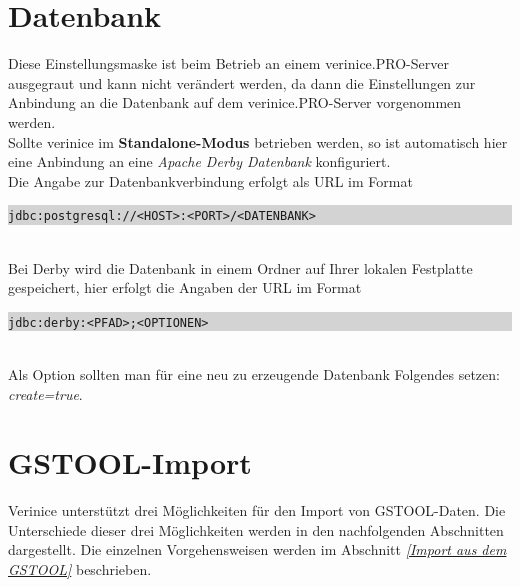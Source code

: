 \documentclass[a4paper,10pt]{book}
\begin{document}
\section{Datenbank} \label{sec:datenbank}
Diese Einstellungsmaske ist beim Betrieb an einem verinice.\textsc{PRO}-Server ausgegraut und kann nicht verändert werden, da dann die Einstellungen zur
Anbindung an die Datenbank auf dem verinice.\textsc{PRO}-Server vorgenommen werden.
\newline\\
Sollte verinice im \textbf{Standalone-Modus} betrieben werden, so ist automatisch hier eine Anbindung an eine {\em Apache Derby Datenbank} konfiguriert.
\newline\\
Die Angabe zur Datenbankverbindung erfolgt als URL im Format
\newline\\
\colorbox{lightgray}{\parbox{\textwidth}{
{\tt jdbc:postgresql://<HOST>:<PORT>/<DATENBANK>}
}}
\newline\\
Bei Derby wird die Datenbank in einem Ordner auf Ihrer lokalen Festplatte gespeichert, hier erfolgt die Angaben der URL im Format
\newline\\
\colorbox{lightgray}{\parbox{\textwidth}{
{\tt jdbc:derby:<PFAD>;<OPTIONEN>}
}}
\newline\\
Als Option sollten man für eine neu zu erzeugende Datenbank Folgendes setzen: {\em create=true}.

\section{GSTOOL-Import}
Verinice unterstützt drei Möglichkeiten für den Import von \textsc{GSTOOL}-Daten. Die Unterschiede dieser drei Möglichkeiten werden in den
nachfolgenden Abschnitten dargestellt. Die einzelnen Vorgehensweisen werden im Abschnitt {\em \ref{Import aus dem GSTOOL} } beschrieben.
\end{document}
